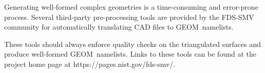 \documentclass[12pt]{article}
\begin{document}
Generating well-formed complex geometries is a time-consuming and error-prone process.
Several third-party pre-processing tools are provided by the FDS-SMV community for automatically translating CAD files to {\ct GEOM}\ namelists.

These tools should always enforce quality checks on the triangulated surfaces and produce well-formed {\ct GEOM}\ namelists. 
Links to these tools can be found at the project home page at https://pages.nist.gov/fds-smv/.



%
%
%
%
%
%
%
%
\end{document}
